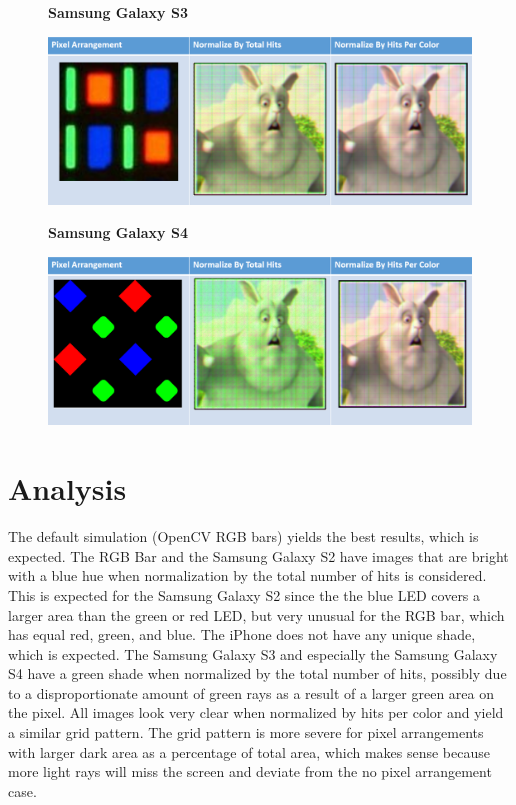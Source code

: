 \begin{figure}
    \centering
    \textbf{Samsung Galaxy S3}\par\medskip
    \includegraphics[width=6in]{chapters/chapter7/images/Samsung_Galaxy_S3.png}
\end{figure}

\begin{figure}
    \centering
    \textbf{Samsung Galaxy S4}\par\medskip
    \includegraphics[width=6in]{chapters/chapter7/images/Samsung_Galaxy_S4.png}
\end{figure}

\newpage
\section{Analysis}

The default simulation (OpenCV RGB bars) yields the best results, which is expected. The RGB Bar and the Samsung Galaxy S2 have images that are bright with a blue hue when normalization by the total number of hits is considered. This is expected for the Samsung Galaxy S2 since the the blue LED covers a larger area than the green or red LED, but very unusual for the RGB bar, which has equal red, green, and blue. The iPhone does not have any unique shade, which is expected. The Samsung Galaxy S3 and especially the Samsung Galaxy S4 have a green shade when normalized by the total number of hits, possibly due to a disproportionate amount of green rays as a result of a larger green area on the pixel. All images look very clear when normalized by hits per color and yield a similar grid pattern. The grid pattern is more severe for pixel arrangements with larger dark area as a percentage of total area, which makes sense because more light rays will miss the screen and deviate from the no pixel arrangement case.

